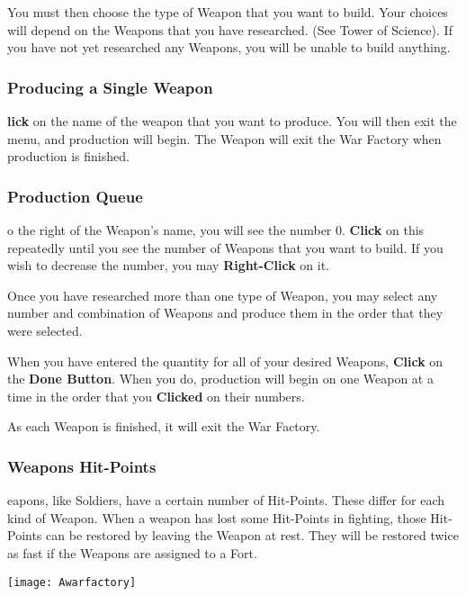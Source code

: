You must then choose the type of Weapon that you want to build. Your choices will depend on the Weapons that you have researched. (See Tower of Science). If you have not yet researched any Weapons, you will be unable to build anything.

\subsubsection{Producing a Single Weapon}

\textbf{lick} on the name of the weapon that you want to produce. You will then exit the menu, and production will begin. The Weapon will exit the War Factory when production is finished.

\subsubsection{Production Queue}

o the right of the Weapon’s name, you will see the number 0. \textbf{Click} on this repeatedly until you see the number of Weapons that you want to build. If you wish to decrease the number, you may \textbf{Right-Click} on it.

Once you have researched more than one type of Weapon, you may select any number and combination of Weapons and produce them in the order that they were selected.

When you have entered the quantity for all of your desired Weapons, \textbf{Click} on the \textbf{Done Button}. When you do, production will begin on one Weapon at a time in the order that you \textbf{Clicked} on their numbers.

As each Weapon is finished, it will exit the War Factory.

\subsubsection{Weapons Hit-Points}



eapons, like Soldiers, have a certain number of Hit-Points. These differ for each kind of Weapon. When a weapon has lost some Hit-Points in fighting, those Hit-Points can be restored by leaving the Weapon at rest. They will be restored twice as fast if the Weapons are assigned to a Fort.

\begin{center}
	\texttt{[image: Awarfactory]} %
\end{center}

